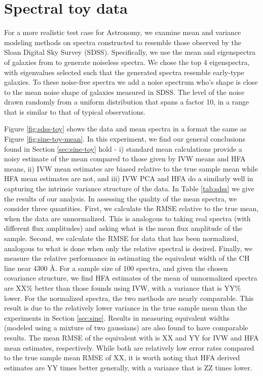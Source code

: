 \documentclass[12pt,preprint]{aastex}
\begin{document}
\section{Spectral toy data}
\label{sec:sdss}

For a more realistic test case for Astronomy, we examine mean and variance modeling 
methods on spectra constructed to resemble those observed by the Sloan Digital Sky 
Survey (SDSS).  Specifically, we use the mean and eigenspectra of galaxies from \citet{yip04a} 
to generate noiseless spectra.  We chose the top 4 eigenspectra, with eigenvalues 
selected such that the generated spectra resemble early-type galaxies.  To these 
noise-free spectra we add a noise spectrum who's shape is close to the mean noise 
shape of galaxies measured in SDSS.  The level of the noise drawn randomly from 
a uniform distribution that spans a factor 10, in a range that is similar to that of typical 
observations.  

Figure \ref{fig:sdss-toy} shows the data and mean spectra in a format the same as 
Figure \ref{fig:sine-toy-mean}.  In this experiment, we find our general conclusions found 
in Section \ref{sec:sine-toy} hold - i) standard mean calculations provide a noisy 
estimate of the mean compared to those given by IVW means and HFA means, 
ii) IVW mean estimates are biased relative to the true sample mean while HFA mean 
estimates are not, and iii) IVW PCA and HFA do a similarly well in capturing the intrinsic 
variance structure of the data.  In Table \ref{tab:sdss} we give the results of our 
analysis.  In assessing the quality of the mean spectra, we consider three quantities.  
First, we calculate the RMSE relative to the true mean, when the data are unnormalized.  
This is analogous to taking real spectra (with different flux amplitudes) and asking what 
is the mean flux amplitude of the sample.  Second, we calculate the RMSE for data that 
has been normalized, analogous to what is done when only the relative spectral is 
desired.  Finally, we measure the relative performance in estimating the equivalent width 
of the CH line near 4300 \AA.  For a sample size of 100 spectra, and given the chosen 
covariance structure, we find HFA estimates of the mean of unnormalized spectra are 
XX\% better than those founds using IVW, with a variance that is YY\% lower.  For the 
normalized spectra, the two methods are nearly comparable.  This result is due to the 
relatively lower variance in the true sample mean than the experiments in Section 
\ref{sec:sine}.  Results in measuring equivalent widths (modeled using a mixture of 
two gaussians) are also found to have comparable results.  The mean RMSE of the 
equivalent with is XX and YY for IVW and HFA mean estimates, respectively.  While both 
are relatively low error rates compared to the true sample mean RMSE of XX, it is worth 
noting that HFA derived estimates are YY times better generally, with a variance that 
is ZZ times lower.  
\end{document}
